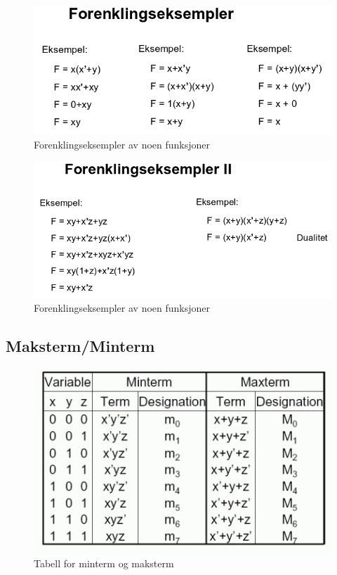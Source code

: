 \documentclass{article}
\begin{document}
	\begin{figure}[H]
		\includegraphics[scale=0.6]{Forenkling.png}
		\caption{Forenklingseksempler av noen funksjoner}
	\end{figure}
	
	\begin{figure}[H]
		\includegraphics[scale=0.6]{Forenkling2.png}
		\caption{Forenklingseksempler av noen funksjoner}
	\end{figure}
	
	\subsection{Maksterm/Minterm}
	
	\begin{figure}[H]
		\includegraphics[scale=0.8]{maksmin.jpg}
		\caption{Tabell for minterm og maksterm}
	\end{figure}
	
\end{document}
